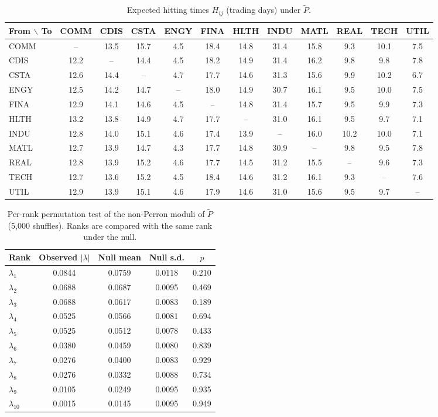 \documentclass[11pt]{article}
\begin{document}
\begin{table}[htbp]\centering
\caption{Expected hitting times $H_{ij}$ (trading days) under $\tilde P$.}
\label{tab:hitting}
\small
\setlength{\tabcolsep}{4pt}
\begin{tabular}{lccccccccccc}
\toprule
From $\backslash$ To & COMM & CDIS & CSTA & ENGY & FINA & HLTH & INDU & MATL & REAL & TECH & UTIL \\
\midrule
COMM & -- & 13.5 & 15.7 & 4.5 & 18.4 & 14.8 & 31.4 & 15.8 & 9.3 & 10.1 & 7.5 \\
CDIS & 12.2 & -- & 14.4 & 4.5 & 18.2 & 14.9 & 31.4 & 16.2 & 9.8 & 9.8 & 7.8 \\
CSTA & 12.6 & 14.4 & -- & 4.7 & 17.7 & 14.6 & 31.3 & 15.6 & 9.9 & 10.2 & 6.7 \\
ENGY & 12.5 & 14.2 & 14.7 & -- & 18.0 & 14.9 & 30.7 & 16.1 & 9.5 & 10.0 & 7.5 \\
FINA & 12.9 & 14.1 & 14.6 & 4.5 & -- & 14.8 & 31.4 & 15.7 & 9.5 & 9.9 & 7.3 \\
HLTH & 13.2 & 13.8 & 14.9 & 4.7 & 17.7 & -- & 31.0 & 16.1 & 9.5 & 9.7 & 7.1 \\
INDU & 12.8 & 14.0 & 15.1 & 4.6 & 17.4 & 13.9 & -- & 16.0 & 10.2 & 10.0 & 7.1 \\
MATL & 12.7 & 13.9 & 14.7 & 4.3 & 17.7 & 14.8 & 30.9 & -- & 9.8 & 9.5 & 7.8 \\
REAL & 12.8 & 13.9 & 15.2 & 4.6 & 17.7 & 14.5 & 31.2 & 15.5 & -- & 9.6 & 7.3 \\
TECH & 12.7 & 13.6 & 15.2 & 4.5 & 18.4 & 14.6 & 31.2 & 16.1 & 9.3 & -- & 7.6 \\
UTIL & 12.9 & 13.9 & 15.1 & 4.6 & 17.9 & 14.6 & 31.0 & 15.6 & 9.5 & 9.7 & -- \\
\bottomrule
\end{tabular}
\end{table}

\begin{table}[htbp]\centering
\caption{Per-rank permutation test of the non-Perron moduli of $\tilde P$ (5{,}000 shuffles). Ranks are compared with the same rank under the null.}
\label{tab:perrank}
\begin{tabular}{lcccc}
\toprule
Rank & Observed $|\lambda|$ & Null mean & Null s.d. & $p$ \\
\midrule
$\lambda_1$ & 0.0844 & 0.0759 & 0.0118 & 0.210 \\
$\lambda_2$ & 0.0688 & 0.0687 & 0.0095 & 0.469 \\
$\lambda_3$ & 0.0688 & 0.0617 & 0.0083 & 0.189 \\
$\lambda_4$ & 0.0525 & 0.0566 & 0.0081 & 0.694 \\
$\lambda_5$ & 0.0525 & 0.0512 & 0.0078 & 0.433 \\
$\lambda_6$ & 0.0380 & 0.0459 & 0.0080 & 0.839 \\
$\lambda_7$ & 0.0276 & 0.0400 & 0.0083 & 0.929 \\
$\lambda_8$ & 0.0276 & 0.0332 & 0.0088 & 0.734 \\
$\lambda_9$ & 0.0105 & 0.0249 & 0.0095 & 0.935 \\
$\lambda_{10}$ & 0.0015 & 0.0145 & 0.0095 & 0.949 \\
\bottomrule
\end{tabular}
\end{table}
\end{document}

